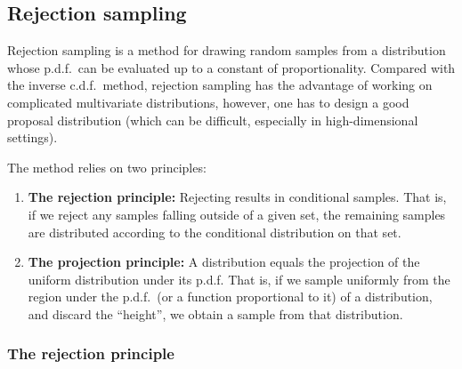 \documentclass[12pt]{article}
\begin{document}
\subsection{Rejection sampling}

Rejection sampling is a method for drawing random samples from a distribution whose p.d.f.\ can be evaluated up to a constant of proportionality. Compared with the inverse c.d.f.\ method, rejection sampling has the advantage of working on complicated multivariate distributions, however, one has to design a good proposal distribution (which can be difficult, especially in high-dimensional settings).

The method relies on two principles:
\begin{enumerate}
\item \textbf{The rejection principle:} Rejecting results in conditional samples. That is, if we reject any samples falling outside of a given set, the remaining samples are distributed according to the conditional distribution on that set.
\item \textbf{The projection principle:} A distribution equals the projection of the uniform distribution under its p.d.f.  That is, if we sample uniformly from the region under the p.d.f.\ (or a function proportional to it) of a distribution, and discard the ``height'', we obtain a sample from that distribution.
\end{enumerate}

\subsubsection{The rejection principle} 
\end{document}
